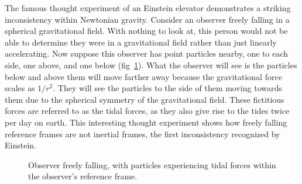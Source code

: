 The famous thought experiment of an Einstein elevator demonstrates a striking inconsistency within Newtonian gravity. Consider an observer freely falling in a spherical gravitational field. With nothing to look at, this person would not be able to determine they were in a gravitational field rather than just linearly accelerating. Now suppose this observer has point particles nearby, one to each side, one above, and one below (fig~\ref{fig:tidal_forces}). What the observer will see is the particles below and above them will move farther away because the gravitational force scales as $1/r^2$. They will see the particles to the side of them moving towards them due to the spherical symmetry of the gravitational field. These fictitious forces are referred to as the tidal forces, as they also give rise to the tides twice per day on earth. This interesting thought experiment shows how freely falling reference frames are not inertial frames, the first inconsistency recognized by Einstein. 
\begin{figure}
    \centering
    \caption{Observer freely falling, with particles experiencing tidal forces within the observer's reference frame.}
    \label{fig:tidal_forces}
\end{figure}

